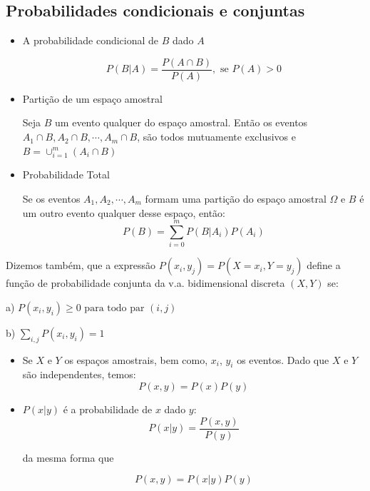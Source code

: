 \documentclass[t]{beamer}
\begin{document}
\subsection{Probabilidades condicionais e conjuntas}
\begin{frame}

\begin{itemize}
	\item A probabilidade condicional de $B$ dado $A$

	\begin{equation}
		P(B | A) = \frac{P(A \cap B)}{P(A)},\text{ se } P(A) > 0
	\end{equation}

	\item Partição de um espaço amostral

	Seja $B$ um evento qualquer do espaço amostral. Então os eventos $A_1 \cap B, A_2 \cap B,\cdots, A_m \cap B$, são todos
	mutuamente exclusivos e $B=\cup_{i=1}^{m}(A_i \cap B)$
	
	\item Probabilidade Total
	
	Se os eventos $A_1,A_2,\cdots,A_m$ formam uma partição do espaço amostral $\Omega$ e $B$ é um outro evento qualquer
	desse espaço, então:
	\begin{equation}
		P(B) = \sum\limits_{i=0}^{m}P(B|A_i)P(A_i)
	\end{equation}


\end{itemize}
\end{frame}


\begin{frame}
	Dizemos também, que a expressão $P(x_i, y_j) = P(X = x_i , Y = y_j)$ define a função de probabilidade conjunta da
	v.a. bidimensional discreta $( X, Y )$ se:

	a) $P(x_i, y_i) \geq 0 \text{ para todo par }(i,j)$
	
	b) $\sum\limits_{i,j} P(x_i, y_i) = 1 $

	\begin{itemize}
	\item Se $X$ e $Y$ os espaços amostrais, bem como, $x_i$, $y_i$ os eventos. Dado que $X$ e $Y$ são independentes, temos:
	\begin{equation}
		P(x,y) = P(x)P(y)
	\end{equation}
	\item $P(x|y)$ é a probabilidade de $x$ dado $y$:
	\begin{equation}
		P(x|y) = \frac{P(x,y)}{P(y)}
	\end{equation}
	
	da mesma forma que

	\begin{equation}
		P(x,y) = P(x|y)P(y)
	\end{equation}
\end{itemize}

\end{frame}
\end{document}
